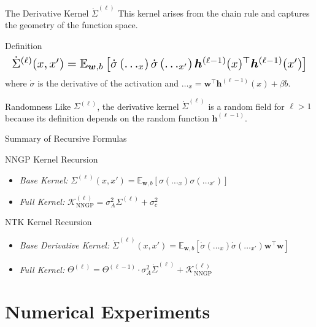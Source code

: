 \documentclass{beamer}
\begin{document}
\begin{frame}{The Derivative Kernel $\dot{\Sigma}^{(\ell)}$}
This kernel arises from the chain rule and captures the geometry of the function space.
\begin{block}{Definition}
\begin{equation*}
\resizebox{\hsize}{!}{$
\dot{\Sigma}^{(\ell)}(x, x') = \mathbb{E}_{\bm{w}, b} \left[ \dot{\sigma}\left(\dots_x\right) \dot{\sigma}\left(\dots_{x'}\right) \bm{h}^{(\ell-1)}(x)^\top \bm{h}^{(\ell-1)}(x') \right]
$}
\end{equation*}
where $\dot{\sigma}$ is the derivative of the activation and $\dots_x = \bm{w}^\top \bm{h}^{(\ell-1)}(x) + \beta b$.
\end{block}
\begin{alertblock}{Randomness}
Like $\Sigma^{(\ell)}$, the derivative kernel $\dot{\Sigma}^{(\ell)}$ is a random field for $\ell > 1$ because its definition depends on the random function $\bm{h}^{(\ell-1)}$.
\end{alertblock}
\end{frame}

\begin{frame}[fragile]{Summary of Recursive Formulas}
\begin{block}{NNGP Kernel Recursion}
\begin{itemize}
    \item \textit{Base Kernel:} $\Sigma^{(\ell)}(x, x') = \mathbb{E}_{\bm{w}, b} \left[ \sigma(\dots_x) \sigma(\dots_{x'}) \right]$
    \item \textit{Full Kernel:} $\mathcal{K}_{\text{NNGP}}^{(\ell)} = \sigma_A^2 \Sigma^{(\ell)} + \sigma_c^2$
\end{itemize}
\end{block}
\begin{block}{NTK Kernel Recursion}
\begin{itemize}
    \item \textit{Base Derivative Kernel:} $\dot{\Sigma}^{(\ell)}(x, x') = \mathbb{E}_{\bm{w}, b} \left[ \dot{\sigma}(\dots_x) \dot{\sigma}(\dots_{x'}) \bm{w}^\top\bm{w} \right]$
    \item \textit{Full Kernel:} $\Theta^{(\ell)} = \Theta^{(\ell-1)} \cdot \sigma_A^2 \dot{\Sigma}^{(\ell)} + \mathcal{K}_{\text{NNGP}}^{(\ell)}$
\end{itemize}
\end{block}
\end{frame}

\section{Numerical Experiments}
\end{document}

